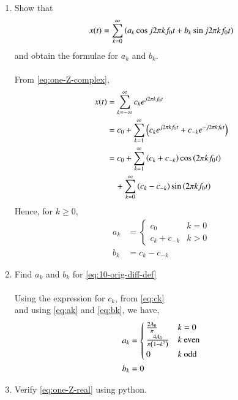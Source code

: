 \documentclass[journal,12pt,twocolumn]{IEEEtran}
\renewcommand\thesection{\arabic{section}}
\begin{document}
\begin{enumerate}[label=\thesection.\arabic*,ref=\thesection.\theenumi]
\item Show that 
	\begin{align}
		x(t) = \sum_{k = 0}^{\infty}\left(a_k\cos{j2\pi kf_0 t}+b_k\sin{j2\pi kf_0 t}\right)
	\label{eq:one-Z-real}
	\end{align}
	and obtain the formulae for $a_k$ and $b_k$. \\
	\solution\\
	\solution From \eqref{eq:one-Z-complex},
	\begin{align*}
		x(t) &= \sum_{k = -\infty}^{\infty}c_ke^{j2\pi kf_0 t} \\
		&= c_0 + \sum_{k = 1}^{\infty} \left(c_ke^{j2\pi kf_0t} + c_{-k}e^{-j2\pi kf_0t}\right) \\
		&= c_0 + \sum_{k = 1}^{\infty} \left(c_k + c_{-k}\right)\cos\left(2\pi kf_0t\right) \\
		& \quad + \sum_{k = 0}^{\infty}\left(c_k - c_{-k}\right)\sin\left(2\pi kf_0t\right)
	\end{align*}
	Hence, for \( k \ge 0 \),
	\begin{align}
		a_k &= 
		\begin{cases}
			c_0 & k = 0 \\
			c_k + c_{-k} & k > 0
		\end{cases}
		\label{eq:ak} \\
		b_k &= c_k - c_{-k}
		\label{eq:bk}
	\end{align}
	

\item Find $a_k$ and $b_k$ for \eqref{eq:10-orig-diff-def} \\
	\solution \\
	Using the expression for \( c_k \), from \eqref{eq:ck} \\
	and using \eqref{eq:ak} and \eqref{eq:bk}, we have,
	\begin{align*}
		a_k &= 
			\begin{cases}
				\frac{2A_0}{\pi} & k = 0 \\
				\frac{4A_0}{\pi\left(1-k^2\right)} & k \text{ even} \\
				0 & k \text{ odd}
			\end{cases} \\
		b_k &= 0
	\end{align*}

\item Verify 
\eqref{eq:one-Z-real}
using python.

\end{enumerate}
\end{document}
